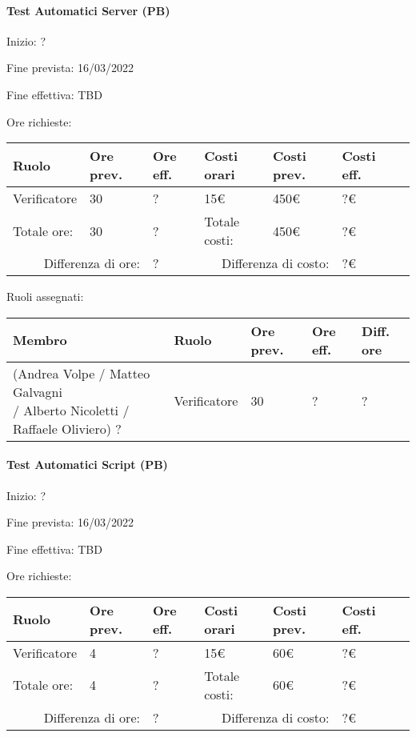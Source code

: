 \documentclass[a4paper, 12pt]{article}
\begin{document}
\paragraph{Test Automatici Server (PB)}
Inizio: ?\par
Fine prevista: 16/03/2022\par
Fine effettiva: TBD

Ore richieste:\\[0.5em]
\begin{tabular}{|l|l|l||l|l|l|l|}\hline
Ruolo & Ore prev. & Ore eff. & Costi orari & Costi prev. & Costi eff.\\\hline
Verificatore & 30 & ? & 15\euro & 450\euro & ?\euro \\\hline
Totale ore: & 30 & ? & Totale costi: & 450\euro & ?\euro \\\hline
\multicolumn{2}{|r|}{Differenza di ore:} & ? & \multicolumn{2}{r|}{Differenza di costo:} & ?\euro \\\hline
\end{tabular}

Ruoli assegnati:\\[0.5em]
\begin{tabular}{|l|l|l|l|l|}\hline
Membro & Ruolo & Ore prev. & Ore eff. & Diff. ore \\\hline
\pbox{20cm}{(Andrea Volpe / Matteo Galvagni\\ / Alberto Nicoletti / Raffaele Oliviero) ?} & Verificatore & 30 & ? & ? \\\hline
\end{tabular}

\paragraph{Test Automatici Script (PB)}
Inizio: ?\par
Fine prevista: 16/03/2022\par
Fine effettiva: TBD

Ore richieste:\\[0.5em]
\begin{tabular}{|l|l|l||l|l|l|l|}\hline
Ruolo & Ore prev. & Ore eff. & Costi orari & Costi prev. & Costi eff.\\\hline
Verificatore & 4 & ? & 15\euro & 60\euro & ?\euro \\\hline
Totale ore: & 4 & ? & Totale costi: & 60\euro & ?\euro \\\hline
\multicolumn{2}{|r|}{Differenza di ore:} & ? & \multicolumn{2}{r|}{Differenza di costo:} & ?\euro \\\hline
\end{tabular}
\end{document}
